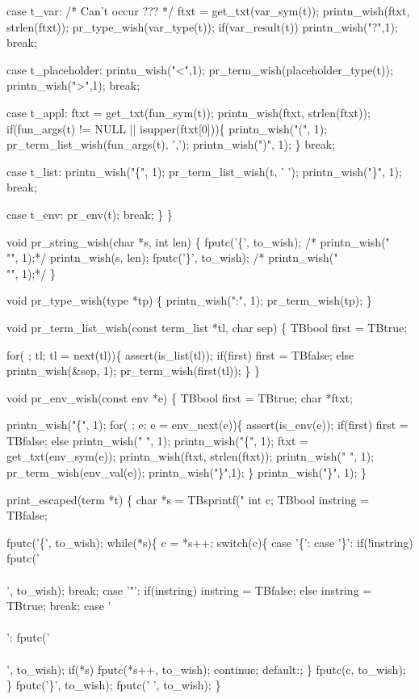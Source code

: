     case t_var: /* Can't occur ??? */
      ftxt = get_txt(var_sym(t));
      printn_wish(ftxt, strlen(ftxt));
      pr_type_wish(var_type(t));
      if(var_result(t))
        printn_wish("?",1);
      break;

    case t_placeholder:
      printn_wish("<",1);
      pr_term_wish(placeholder_type(t));
      printn_wish(">",1);
      break;

    case t_appl:
      ftxt = get_txt(fun_sym(t));
      printn_wish(ftxt, strlen(ftxt));
      if(fun_args(t) != NULL || isupper(ftxt[0]))\{
        printn_wish("(", 1);
        pr_term_list_wish(fun_args(t), ',');
        printn_wish(")", 1);
      \}
      break;

    case t_list:
      printn_wish("\{", 1); 
      pr_term_list_wish(t, ' ');
      printn_wish("\}", 1);
      break;

    case t_env:
      pr_env(t);
      break;
    \}
\}

void pr_string_wish(char *s, int len)
\{
  fputc('\{', to_wish);
/*  printn_wish("\\"", 1);*/
  printn_wish(s, len);
  fputc('\}', to_wish);
/*  printn_wish("\\"", 1);*/
\}

void pr_type_wish(type *tp)
\{
  printn_wish(":", 1); 
  pr_term_wish(tp);
\}

void pr_term_list_wish(const term_list *tl, char sep)
\{
  TBbool first = TBtrue;

  for( ; tl; tl = next(tl))\{
    assert(is_list(tl));    
    if(first)
      first = TBfalse;
    else
      printn_wish(&sep, 1);
    pr_term_wish(first(tl));
  \}
\}

void pr_env_wish(const env *e)
\{
  TBbool first = TBtrue;
  char *ftxt;

  printn_wish("\{", 1);
  for( ; e; e = env_next(e))\{
    assert(is_env(e));    
    if(first)
      first = TBfalse;
    else
      printn_wish(" ", 1);
    printn_wish("\{", 1);
    ftxt = get_txt(env_sym(e));
    printn_wish(ftxt, strlen(ftxt));
    printn_wish(" ", 1);
    pr_term_wish(env_val(e));
    printn_wish("\}",1);
  \}
  printn_wish("\}", 1);
\}


print_escaped(term *t)
\{
  char *s = TBsprintf("%
  int c;
  TBbool instring = TBfalse;

  fputc('\{', to_wish);
  while(*s)\{
    c = *s++;
    switch(c)\{
    case '\{': case '\}':
      if(!instring)
        fputc('\\\\', to_wish);
      break;
    case '"':      
      if(instring)
        instring = TBfalse;
      else
        instring = TBtrue;
      break;
    case '\\\\':
      fputc('\\\\', to_wish);
      if(*s)
        fputc(*s++, to_wish);
      continue;
    default:;
    \}
    fputc(c, to_wish);
  \}
  fputc('\}', to_wish);
  fputc(' ', to_wish);
\}



